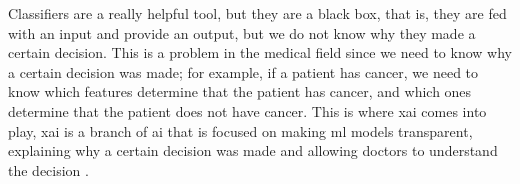 
Classifiers are a really helpful tool, but they are a black box, that is, they are fed with an input and provide an output, but we do not know why they made a certain decision. This is a problem in the medical field since we need to know why a certain decision was made; for example, if a patient has cancer, we need to know which features determine that the patient has cancer, and which ones determine that the patient does not have cancer. This is where \ac{xai} comes into play, \ac{xai} is a branch of \ac{ai} that is focused on making \ac{ml} models transparent, explaining why a certain decision was made and allowing doctors to understand the decision \cite{borys_explainable_2023}.